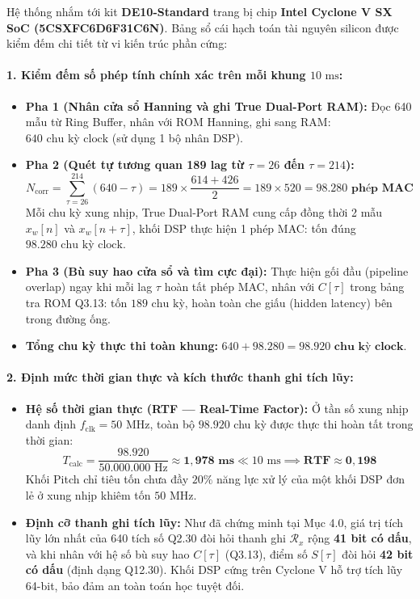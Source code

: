 \documentclass[11pt,a4paper]{article}
\begin{document}
Hệ thống nhắm tới kit \textbf{DE10-Standard} trang bị chip \textbf{Intel Cyclone V SX SoC (5CSXFC6D6F31C6N)}. Bảng sổ cái hạch toán tài nguyên silicon được kiểm đếm chi tiết từ vi kiến trúc phần cứng:

\paragraph{1. Kiểm đếm số phép tính chính xác trên mỗi khung $10\text{ ms}$:}
\begin{itemize}
    \setlength{\itemsep}{1pt}
    \item \textbf{Pha 1 (Nhân cửa sổ Hanning và ghi True Dual-Port RAM):} 
    Đọc 640 mẫu từ Ring Buffer, nhân với ROM Hanning, ghi sang RAM: $640\text{ chu kỳ clock}$ (sử dụng 1 bộ nhân DSP).
    \item \textbf{Pha 2 (Quét tự tương quan 189 lag từ $\tau = 26$ đến $\tau = 214$):}
    \begin{equation}
    N_{\text{corr}} = \sum_{\tau=26}^{214} (640 - \tau) = 189 \times \frac{614 + 426}{2} = 189 \times 520 = \mathbf{98.280\text{ phép MAC}}
    \end{equation}
    Mỗi chu kỳ xung nhịp, True Dual-Port RAM cung cấp đồng thời 2 mẫu $x_w[n]$ và $x_w[n+\tau]$, khối DSP thực hiện 1 phép MAC: tốn đúng $98.280\text{ chu kỳ clock}$.
    \item \textbf{Pha 3 (Bù suy hao cửa sổ và tìm cực đại):}
    Thực hiện gối đầu (pipeline overlap) ngay khi mỗi lag $\tau$ hoàn tất phép MAC, nhân với $C[\tau]$ trong bảng tra ROM Q3.13: tốn $189\text{ chu kỳ}$, hoàn toàn che giấu (hidden latency) bên trong đường ống.
    \item \textbf{Tổng chu kỳ thực thi toàn khung:} $640 + 98.280 = \mathbf{98.920\text{ chu kỳ clock}}$.
\end{itemize}

\paragraph{2. Định mức thời gian thực và kích thước thanh ghi tích lũy:}
\begin{itemize}
    \setlength{\itemsep}{1pt}
    \item \textbf{Hệ số thời gian thực (RTF --- Real-Time Factor):} Ở tần số xung nhịp danh định $f_{\text{clk}} = 50\text{ MHz}$, toàn bộ $98.920$ chu kỳ được thực thi hoàn tất trong thời gian:
    \begin{equation}
    T_{\text{calc}} = \frac{98.920}{50.000.000\text{ Hz}} \approx \mathbf{1{,}978\text{ ms}} \ll 10\text{ ms} \implies \mathbf{\text{RTF} \approx 0{,}198}
    \end{equation}
    Khối Pitch chỉ tiêu tốn chưa đầy $20\%$ năng lực xử lý của một khối DSP đơn lẻ ở xung nhịp khiêm tốn $50\text{ MHz}$.
    \item \textbf{Định cỡ thanh ghi tích lũy:} Như đã chứng minh tại Mục 4.0, giá trị tích lũy lớn nhất của 640 tích số Q2.30 đòi hỏi thanh ghi $\mathcal{R}_x$ rộng \textbf{41 bit có dấu}, và khi nhân với hệ số bù suy hao $C[\tau]$ (Q3.13), điểm số $S[\tau]$ đòi hỏi \textbf{42 bit có dấu} (định dạng Q12.30). Khối DSP cứng trên Cyclone V hỗ trợ tích lũy 64-bit, bảo đảm an toàn toán học tuyệt đối.
\end{itemize}
\end{document}
